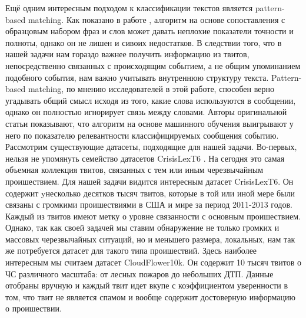 Ещё одним интересным подходом к классификации текстов является pattern-based matching. Как показано в работе \cite{matching}, алгоритм на основе сопоставления с образцовым набором фраз и слов может давать неплохие показатели точности и полноты, однако он не лишен и сивоих недостатков. В следствии того, что в нашей задачи нам гораздо важнее получить информацию из твитов, непосредственно связанных с происходящим событием, а не общим упоминанием подобного события, нам важно учитывать внутреннюю структуру текста. Pattern-based matching, по мнению исследователей в этой работе, способен верно угадывать общий смысл исходя из того, какие слова используются в сообщении, однако он полностью игнорирует связь между словами. Авторы оригинальной статьи показывают, что алгоритм на основе машинного обучения выигрывают у него по показателю релевантности классифицируемых сообщения событию.\\

Рассмотрим существующие датасеты, подходящие для нашей задачи. Во-первых, нельзя не упомянуть семейство датасетов CrisisLexT6 \cite{crisislex}. На сегодня это самая объемная коллекция твитов, связанных с тем или иным черезвычайным проишествием. Для нашей задачи видится интересным датасет CrisisLexT6. Он содержит yнесколько десятков тысяч твитов, которые в той или иной мере были связаны с громкими проишествиями в США и мире за период 2011-2013 годов. Каждый из твитов имеют метку о уровне связанности с основным проишествием. Однако, так как своей задачей мы ставим обнаружение не только громких и массовых черезвычайных ситуаций, но и меньшего размера, локальных, нам так же потребуется датасет для такого типа проишествий. Здесь наиболее интересным мы считаем датасет CloudFlower10k. Он содержит 10 тысяч твитов о ЧС различного масштаба: от лесных пожаров до небольших ДТП. Данные отобраны вручную и каждый твит идет вкупе с коэффициентом уверенности в том, что твит не является спамом и вообще содержит достоверную информацию о проишествии. 

\pagebreak
